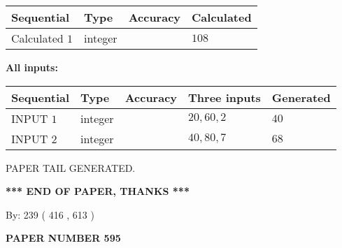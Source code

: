 \documentclass{ctexart}
\begin{document}
   
   
   
\noindent{}
   
   
  
  
\noindent\begin{tabular}{|l|l|l|l|}
\hline
 Sequential & Type & Accuracy & Calculated \\ 
\hline
 
 
  Calculated $  1 $ & integer &  & 
  $ 108 $ 
 \\  \hline  
 \end{tabular}
   
   
   
   
\noindent\vspace{0.1in}\hspace{-0.08in} {\textbf{\Large{All inputs: }}}
   
   
  
  
\noindent\begin{tabular}{|l|l|l|l|l|}
\hline
 Sequential & Type & Accuracy & Three inputs & Generated \\ 
\hline
 
 
  INPUT $  1 $ & integer &  & $
 20
 , 
 60
 , 
 2
 $ & $ 40 $ 
 \\  \hline  
 
 
  INPUT $  2 $ & integer &  & $
 40
 , 
 80
 , 
 7
 $ & $ 68 $ 
 \\  \hline  
 \end{tabular}
   
   
   
   
   
   
 \vspace{0.2in}
 
   
   
\vspace{2.0in} PAPER TAIL GENERATED.
   
   
   
   
\vspace{1.0in} 
{\textbf{\large{ *** END OF PAPER, THANKS *** }}} 
   
   
\hspace{1.0in} By: 
 239 ( 416 ,  613 )
   
   
   
   
\newpage 
\setcounter{page}{ 
   595001 } 
   
   
   
   
 {\textbf{ \Large{ PAPER NUMBER  595  }}}
   
\end{document}
